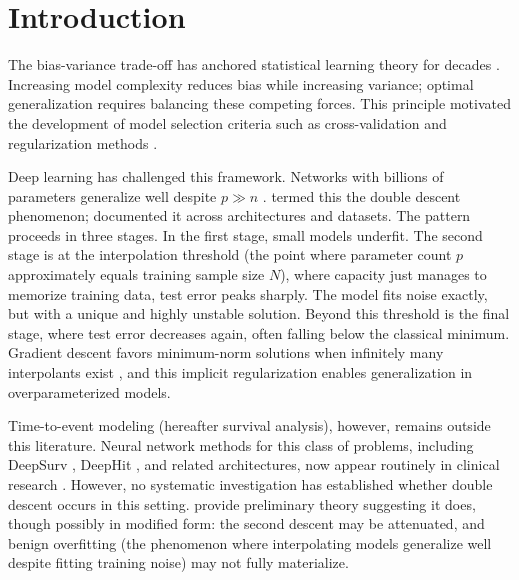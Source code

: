 \documentclass[12pt,a4paper]{article}
\begin{document}
\clearpage

\section{Introduction}

The bias-variance trade-off has anchored statistical learning theory for decades \citep{hastie2009elements}. Increasing model complexity reduces bias while increasing variance; optimal generalization requires balancing these competing forces. This principle motivated the development of model selection criteria such as cross-validation and regularization methods \citep{tibshirani1996regression}.

Deep learning has challenged this framework. Networks with billions of parameters generalize well despite $p \gg n$ \citep{zhang2021understanding}. \citet{belkin2019reconciling} termed this the double descent phenomenon; \citet{nakkiran2021deep} documented it across architectures and datasets. The pattern proceeds in three stages. In the first stage, small models underfit. The second stage is at the interpolation threshold (the point where parameter count $p$ approximately equals training sample size $N$), where capacity just manages to memorize training data, test error peaks sharply. The model fits noise exactly, but with a unique and highly unstable solution. Beyond this threshold is the final stage, where test error decreases again, often falling below the classical minimum. Gradient descent favors minimum-norm solutions when infinitely many interpolants exist \citep{bartlett2020benign}, and this implicit regularization enables generalization in overparameterized models.

Time-to-event modeling (hereafter survival analysis), however, remains outside this literature. Neural network methods for this class of problems, including DeepSurv \citep{katzman2018deepsurv}, DeepHit \citep{lee2018deephit}, and related architectures, now appear routinely in clinical research \citep{wiegrebe2024deep}. However, no systematic investigation has established whether double descent occurs in this setting. \citet{liu2025understanding} provide preliminary theory suggesting it does, though possibly in modified form: the second descent may be attenuated, and benign overfitting (the phenomenon where interpolating models generalize well despite fitting training noise) may not fully materialize.
\end{document}
